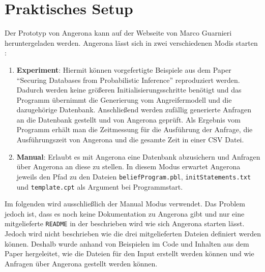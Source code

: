 \documentclass[german,version-2020-11]{uzl-thesis}
\begin{document}
\section{Praktisches Setup} \label{2.2}
Der Prototyp von Angerona kann auf der Webseite von Marco Guarnieri \cite{6} heruntergeladen werden. Angerona lässt sich in zwei verschiedenen Modis starten :
\begin{enumerate}
	\item \textbf{Experiment}: Hiermit können vorgefertigte Beispiele aus dem Paper \enquote{Securing Databases from Probabilistic Inference} \cite{guarnieri2017securing} reproduziert werden. Dadurch werden keine größeren Initialisierungsschritte benötigt und das Programm übernimmt die Generierung vom Angreifermodell und die dazugehörige Datenbank. Anschließend werden zufällig generierte Anfragen an die Datenbank gestellt und von Angerona geprüft. Als Ergebnis vom Programm erhält man die Zeitmessung für die Ausführung der Anfrage, die Ausführungszeit von Angerona und die gesamte Zeit in einer CSV Datei.
	\item \textbf{Manual}: Erlaubt es mit Angerona eine Datenbank abzusichern und Anfragen über Angerona an diese zu stellen.
	In diesem Modus erwartet Angerona jeweils den Pfad zu den Dateien \texttt{beliefProgram.pbl}, \texttt{initStatements.txt} und \texttt{template.cpt} als Argument bei Programmstart.
\end{enumerate}
Im folgenden wird ausschließlich der Manual Modus verwendet. Das Problem jedoch ist, dass es noch keine Dokumentation zu Angerona gibt und nur eine mitgelieferte \texttt{README} in der beschrieben wird wie sich Angerona starten lässt. Jedoch wird nicht beschrieben wie die drei mitgelieferten Dateien definiert werden können. Deshalb wurde anhand von Beispielen im Code und Inhalten aus dem Paper hergeleitet, wie die Dateien für den Input erstellt werden können und wie Anfragen über Angerona gestellt werden können.
\end{document}

